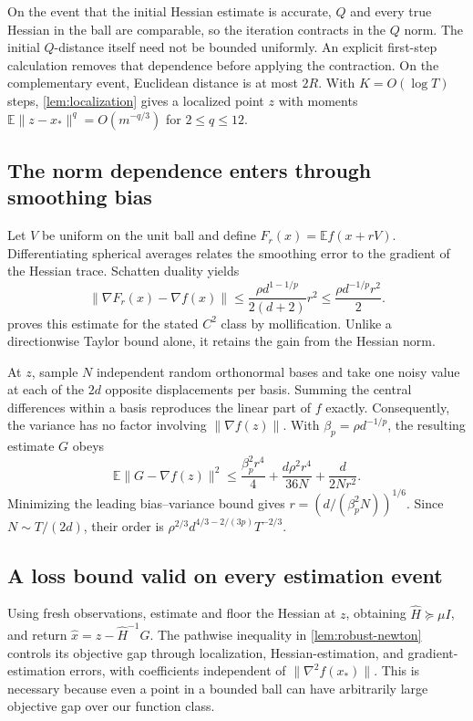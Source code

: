 \documentclass[11pt,a4paper]{article}
\newcommand{\E}{\mathbb E}
\theoremstyle{definition}
\theoremstyle{remark}
\begin{document}
On the event that the initial Hessian estimate is accurate, $Q$ and every true Hessian in the ball are comparable, so the iteration contracts in the $Q$ norm. The initial $Q$-distance itself need not be bounded uniformly. An explicit first-step calculation removes that dependence before applying the contraction. On the complementary event, Euclidean distance is at most $2R$. With $K=O(\log T)$ steps, \cref{lem:localization} gives a localized point $z$ with moments $\E\|z-x_*\|^q=O(m^{-q/3})$ for $2\le q\le12$.

\subsection{The norm dependence enters through smoothing bias}
Let $V$ be uniform on the unit ball and define $F_r(x)=\E f(x+rV)$. Differentiating spherical averages relates the smoothing error to the gradient of the Hessian trace. Schatten duality yields
\[
 \|\nabla F_r(x)-\nabla f(x)\|
 \le \frac{\rho d^{1-1/p}}{2(d+2)}r^2
 \le \frac{\rho d^{-1/p}r^2}{2}.
\]
 proves this estimate for the stated $C^2$ class by mollification. Unlike a directionwise Taylor bound alone, it retains the gain from the Hessian norm.

At $z$, sample $N$ independent random orthonormal bases and take one noisy value at each of the $2d$ opposite displacements per basis. Summing the central differences within a basis reproduces the linear part of $f$ exactly. Consequently, the variance has no factor involving $\|\nabla f(z)\|$. With $\beta_p=\rho d^{-1/p}$, the resulting estimate $G$ obeys
\[
 \E\|G-\nabla f(z)\|^2
 \le \frac{\beta_p^2r^4}{4}
       +\frac{d\rho^2r^4}{36N}
       +\frac{d}{2Nr^2}.
\]
Minimizing the leading bias--variance bound gives $r=(d/(\beta_p^2N))^{1/6}$. Since $N\sim T/(2d)$, their order is $\rho^{2/3}d^{4/3-2/(3p)}T^{-2/3}$.

\subsection{A loss bound valid on every estimation event}
Using fresh observations, estimate and floor the Hessian at $z$, obtaining $\widehat H\succeq\mu I$, and return $\widehat x=z-\widehat H^{-1}G$. The pathwise inequality in \cref{lem:robust-newton} controls its objective gap through localization, Hessian-estimation, and gradient-estimation errors, with coefficients independent of $\|\nabla^2 f(x_*)\|$. This is necessary because even a point in a bounded ball can have arbitrarily large objective gap over our function class.
\end{document}
